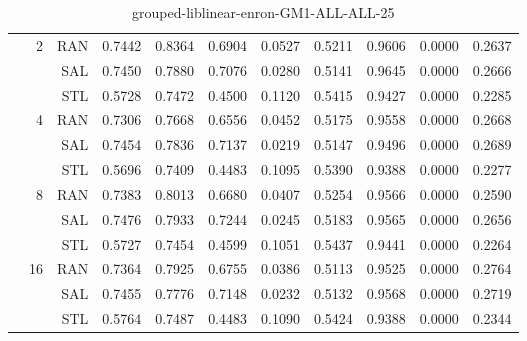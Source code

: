 \begin{center}
\begin{table}[htbp]
\begin{center}
\begin{tabular}{ | r | r | r | r | r | r | r | r | r | r | r |}
 & \multirow{3}{*}{2} & RAN & 0.7442 & 0.8364 & 0.6904 & 0.0527 & 0.5211 & 0.9606 & 0.0000 & 0.2637\\ \cline{3-11}
 &   & SAL & 0.7450 & 0.7880 & 0.7076 & 0.0280 & 0.5141 & 0.9645 & 0.0000 & 0.2666\\ \cline{3-11}
 &   & STL & 0.5728 & 0.7472 & 0.4500 & 0.1120 & 0.5415 & 0.9427 & 0.0000 & 0.2285\\ \cline{2-11}
 & \multirow{3}{*}{4} & RAN & 0.7306 & 0.7668 & 0.6556 & 0.0452 & 0.5175 & 0.9558 & 0.0000 & 0.2668\\ \cline{3-11}
 &   & SAL & 0.7454 & 0.7836 & 0.7137 & 0.0219 & 0.5147 & 0.9496 & 0.0000 & 0.2689\\ \cline{3-11}
 &   & STL & 0.5696 & 0.7409 & 0.4483 & 0.1095 & 0.5390 & 0.9388 & 0.0000 & 0.2277\\ \cline{2-11}
 & \multirow{3}{*}{8} & RAN & 0.7383 & 0.8013 & 0.6680 & 0.0407 & 0.5254 & 0.9566 & 0.0000 & 0.2590\\ \cline{3-11}
 &   & SAL & 0.7476 & 0.7933 & 0.7244 & 0.0245 & 0.5183 & 0.9565 & 0.0000 & 0.2656\\ \cline{3-11}
 &   & STL & 0.5727 & 0.7454 & 0.4599 & 0.1051 & 0.5437 & 0.9441 & 0.0000 & 0.2264\\ \cline{2-11}
 & \multirow{3}{*}{16} & RAN & 0.7364 & 0.7925 & 0.6755 & 0.0386 & 0.5113 & 0.9525 & 0.0000 & 0.2764\\ \cline{3-11}
 &   & SAL & 0.7455 & 0.7776 & 0.7148 & 0.0232 & 0.5132 & 0.9568 & 0.0000 & 0.2719\\ \cline{3-11}
 &   & STL & 0.5764 & 0.7487 & 0.4483 & 0.1090 & 0.5424 & 0.9388 & 0.0000 & 0.2344\\ \cline{2-11}
\hline
\end{tabular}
\caption{grouped-liblinear-enron-GM1-ALL-ALL-25}
\end{center}
 \end{table}
\end{center}

